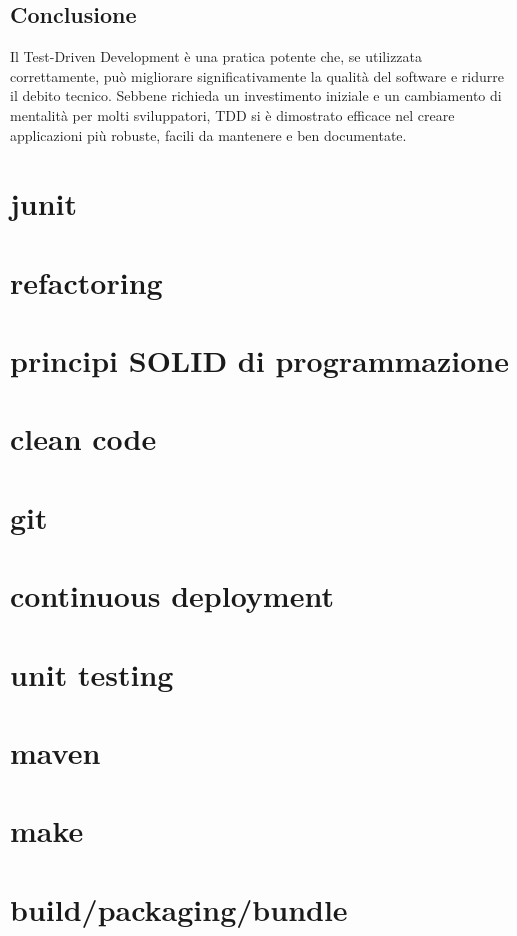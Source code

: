 \documentclass{article}
\begin{document}
\subsection{Conclusione}
Il Test-Driven Development è una pratica potente che, se utilizzata correttamente, può migliorare significativamente la qualità del software e ridurre il debito tecnico. Sebbene richieda un investimento iniziale e un cambiamento di mentalità per molti sviluppatori, TDD si è dimostrato efficace nel creare applicazioni più robuste, facili da mantenere e ben documentate.

\section{junit}
\section{refactoring}
\section{principi SOLID di programmazione}
\section{clean code}
\section{git}
\section{continuous deployment}
\section{unit testing}
\section{maven}
\section{make}
\section{build/packaging/bundle}
\end{document}
